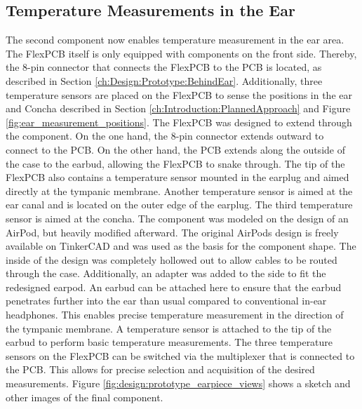 
\subsection{Temperature Measurements in the Ear}
\label{ch:Design:Prototype:Earpiece}

The second component now enables temperature measurement in the ear area. The FlexPCB itself is only equipped with components on the front side. Thereby, the 8-pin connector that connects the FlexPCB to the PCB is located, as described in Section \ref{ch:Design:Prototype:BehindEar}.
Additionally, three temperature sensors are placed on the FlexPCB to sense the positions in the ear and Concha described in Section \ref{ch:Introduction:PlannedApproach} and Figure \ref{fig:ear_measurement_positions}.
The FlexPCB was designed to extend through the component. 
On the one hand, the 8-pin connector extends outward to connect to the PCB. 
On the other hand, the PCB extends along the outside of the case to the earbud, allowing the FlexPCB to snake through. 
The tip of the FlexPCB also contains a temperature sensor mounted in the earplug and aimed directly at the tympanic membrane. 
Another temperature sensor is aimed at the ear canal and is located on the outer edge of the earplug. The third temperature sensor is aimed at the concha.
The component was modeled on the design of an AirPod, but heavily modified afterward. 
The original AirPods design is freely available on TinkerCAD and was used as the basis for the component shape. 
The inside of the design was completely hollowed out to allow cables to be routed through the case. Additionally, an adapter was added to the side to fit the redesigned earpod. 
An earbud can be attached here to ensure that the earbud penetrates further into the ear than usual compared to conventional in-ear headphones. 
This enables precise temperature measurement in the direction of the tympanic membrane. 
A temperature sensor is attached to the tip of the earbud to perform basic temperature measurements.
The three temperature sensors on the FlexPCB can be switched via the multiplexer that is connected to the PCB. 
This allows for precise selection and acquisition of the desired measurements. Figure \ref{fig:design:prototype_earpiece_views} shows a sketch and other images of the final component.


